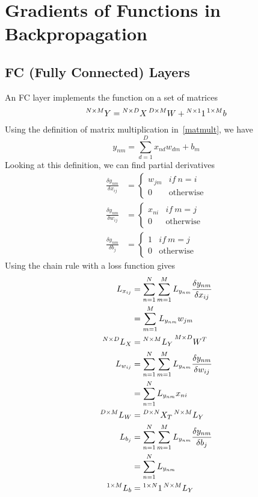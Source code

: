 \documentclass{article}
\numberwithin{equation}{subsection}
\begin{document}
\section{Gradients of Functions in Backpropagation}
\subsection{FC (Fully Connected) Layers}
An FC layer implements the function on a set of matrices
\begin{equation}
    \prescript{N\times M}{}{Y} = \prescript{N\times D}{}{X}\prescript{D\times M}{}{W} + \prescript{N\times1}{}{1}\prescript{1\times M}{}{b}
\end{equation}
Using the definition of matrix multiplication in~\ref{matmult}, we have
\begin{equation}
y_{nm} = \sum_{d=1}^D x_{nd} w_{dm}+b_m
\end{equation}
Looking at this definition, we can find partial derivatives 
\begin{align}
    \frac{\delta y_{nm}}{\delta x_{ij}} &= \begin{cases}
        w_{jm} & if\ n=i\\
        0 & \text{otherwise}
    \end{cases}\\
    \frac{\delta y_{nm}}{\delta w_{ij}} &= \begin{cases}
        x_{ni} & if\ m=j\\
        0 & \text{otherwise}
    \end{cases}\\
    \frac{\delta y_{nm}}{\delta b_{j}} &= \begin{cases}
        1 & if\ m=j\\
        0 & \text{otherwise}
    \end{cases}
\end{align}
Using the chain rule with a loss function gives
\begin{align}
    L_{x_{ij}} &= \sum_{n=1}^N\sum_{m=1}^M L_{y_{nm}} \frac{\delta y_{nm}}{\delta x_{ij}}\\
    &= \sum_{m=1}^M L_{y_{nm}} w_{jm}\\
    \prescript{N\times D}{}{L_X} &= \prescript{N\times M}{}{L_Y}\prescript{M\times D}{}{W^T}\\
    L_{w_{ij}} &= \sum_{n=1}^N\sum_{m=1}^M L_{y_{nm}} \frac{\delta y_{nm}}{\delta w_{ij}}\\
    &= \sum_{n=1}^N L_{y_{nm}} x_{ni}\\
    \prescript{D\times M}{}{L_W} &= \prescript{D\times N}{}{X_T}\prescript{N\times M}{}{L_Y}\\
    L_{b_{j}} &= \sum_{n=1}^N\sum_{m=1}^M L_{y_{nm}} \frac{\delta y_{nm}}{\delta b_{j}}\\
    &= \sum_{n=1}^N L_{y_{nm}}\\
    \prescript{1\times M}{}{L_b} &= \prescript{1\times N}{}{1}\prescript{N\times M}{}{L_Y}
\end{align}
\end{document}
